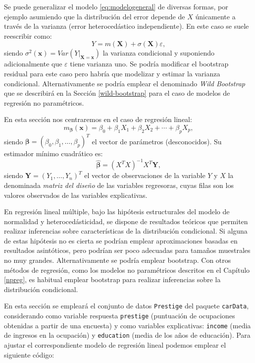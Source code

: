 \documentclass[
]{book}
\theoremstyle{break}
\theoremstyle{definition}
\theoremstyle{definition}
\theoremstyle{definition}
\theoremstyle{remark}
\begin{document}
Se puede generalizar el modelo \eqref{eq:modelogeneral} de diversas formas, por ejemplo asumiendo que la distribución del error depende de \(X\) únicamente a través de la varianza (error heterocedástico independiente).
En este caso se suele reescribir como:
\[Y = m(\mathbf{X}) + \sigma(\mathbf{X}) \varepsilon,\]
siendo \(\sigma^2(\mathbf{x}) = Var\left( \left. Y\right\vert_{\mathbf{X}=\mathbf{x}} \right)\) la varianza condicional y suponiendo adicionalmente que \(\varepsilon\) tiene varianza uno.
Se podría modificar el bootstrap residual para este caso pero habría que modelizar y estimar la varianza condicional.
Alternativamente se podría emplear el denominado \emph{Wild Bootstrap} que se describirá en la Sección \ref{wild-bootstrap} para el caso de modelos de regresión no paramétricos.

En esta sección nos centraremos en el caso de regresión lineal:
\[m_{\boldsymbol{\beta}}(\mathbf{x}) =  \beta_{0} + \beta_{1}X_{1} + \beta_{2}X_{2} + \cdots + \beta_{p}X_{p},\]
siendo \(\boldsymbol{\beta} = \left( \beta_{0}, \beta_{1}, \ldots, \beta_{p} \right)^{T}\) el vector de parámetros (desconocidos).
Su estimador mínimo cuadrático es:
\[\boldsymbol{\hat{\beta}} = \left( X^{T}X\right)^{-1}X^{T}\mathbf{Y},\]
siendo \(\mathbf{Y} = \left( Y_{1}, \ldots, Y_{n} \right)^{T}\) el vector de observaciones de la variable \(Y\) y \(X\) la denominada \emph{matriz del diseño} de las variables regresoras, cuyas filas son los valores observados de las variables explicativas.

En regresión lineal múltiple, bajo las hipótesis estructurales del modelo de normalidad y heterocedásticidad, se dispone de resultados teóricos que permiten realizar inferencias sobre características de la distribución condicional. Si alguna de estas hipótesis no es cierta se podrían emplear aproximaciones basadas en resultados asintóticos, pero podrían ser poco adecuadas para tamaños muestrales no muy grandes. Alternativamente se podría emplear bootstrap.
Con otros métodos de regresión, como los modelos no paramétricos descritos en el Capítulo \ref{npreg}, es habitual emplear bootstrap para realizar inferencias sobre la distribución condicional.

En esta sección se empleará el conjunto de datos \texttt{Prestige} del paquete \texttt{carData}, considerando como variable respuesta \texttt{prestige} (puntuación de ocupaciones obtenidas a partir de una encuesta) y como variables explicativas: \texttt{income} (media de ingresos en la ocupación) y \texttt{education} (media de los años de educación).
Para ajustar el correspondiente modelo de regresión lineal podemos emplear el siguiente código:
\end{document}
